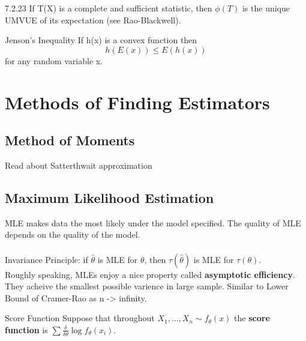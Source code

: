 \documentclass[11pt,fleqn]{book} %
\begin{document}
 \begin{theorem}{7.2.23}
 	If T(X) is a complete and sufficient statistic, then $\phi(T)$ is the unique UMVUE of its expectation (see Rao-Blackwell).
 \end{theorem}

 \begin{definition}{Jenson's Inequality}
 If h(x) is a convex function then 
 $$h(E(x))\le E(h(x)) $$
for any random variable x.  	
 \end{definition}

 \section{Methods of Finding Estimators}

 \subsection{Method of Moments}
\begin{remark}
	Read about Satterthwait approximation
\end{remark}

\subsection{Maximum Likelihood Estimation}

MLE makes data the most likely under the model specified. The quality of MLE depends on the quality of the model. \\
\\
Invariance Principle: if $\hat{\theta}$ is MLE for $\theta$, then $\tau(\hat{\theta})$ is MLE for $\tau(\theta)$. \\

Roughly speaking, MLEs enjoy a nice property called \textbf{asymptotic efficiency}. They acheive the smallest possible varience in large sample. Similar to Lower Bound of Cramer-Rao as n -> infinity. 

\begin{definition}{Score Function}
	Suppose that throughout $X_1,\dots,X_n \sim f_\theta(x)$ the \textbf{score function} is $\sum \frac{\delta}{\delta \theta} \log f_\theta(x_i)$. 
\end{definition}
\end{document}
